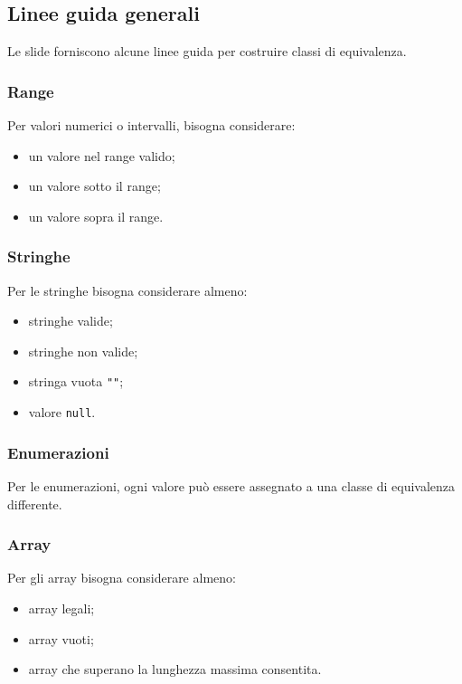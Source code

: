 \subsection{Linee guida generali}

Le slide forniscono alcune linee guida per costruire classi di equivalenza.

\subsubsection{Range}

Per valori numerici o intervalli, bisogna considerare:

\begin{itemize}
    \item un valore nel range valido;
    \item un valore sotto il range;
    \item un valore sopra il range.
\end{itemize}

\subsubsection{Stringhe}

Per le stringhe bisogna considerare almeno:

\begin{itemize}
    \item stringhe valide;
    \item stringhe non valide;
    \item stringa vuota \texttt{""};
    \item valore \texttt{null}.
\end{itemize}

\subsubsection{Enumerazioni}

Per le enumerazioni, ogni valore può essere assegnato a una classe di equivalenza differente.

\subsubsection{Array}

Per gli array bisogna considerare almeno:

\begin{itemize}
    \item array legali;
    \item array vuoti;
    \item array che superano la lunghezza massima consentita.
\end{itemize}

